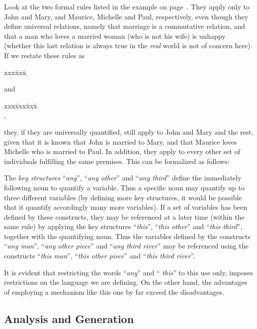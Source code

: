 Look at the two formal rules listed in the example on
page~\pageref{specrules}. They apply only to John and Mary, and
Maurice, Michelle and Paul, respectively, even though they define
universal relations, namely that marriage is a commutative relation,
and that a man who loves a married woman (who is not his wife) is
unhappy (whether this last relation is always true in the {\em real\/}
world is not of concern here). If we restate these rules as
\begin{tabbing}
  xxx\= xxx\= \kill
  \>
\end{tabbing}
and
\begin{tabbing}
  xxx\= xxx\= xxx\= \kill
  \>\\
  \>\>,
\end{tabbing}
they, if they are universally quantified, still apply to John and Mary
and the rest, given that it is known that John is married to Mary, and
that Maurice loves Michelle who is married to Paul. In addition, they
apply to every other set of individuals fulfilling the same premises.
This can be formalized as follows:

The {\em key structures\/} ``{\em any\/}'', ``{\em any other\/}'' and
``{\em any third\/}'' define the immediately following noun to
quantify a variable. Thus a specific noun may quantify up to three
different variables (by defining more key structures, it would be
possible that it quantify accordingly many more variables). If a set
of variables has been defined by these constructs, they may be
referenced at a later time (within the same rule) by applying the key
structures ``{\em this\/}'', ``{\em this other\/}'' and ``{\em this
third\/}'', together with the quantifying noun. Thus the variables
defined by the constructs ``{\em any man\/}'', ``{\em any other
piece\/}'' and ``{\em any third river\/}'' may be referenced using the
constructs ``{\em this man\/}'', ``{\em this other piece\/}'' and
``{\em this third river\/}''.

It is evident that restricting the words ``{\em any\/}'' and ``{\em
this\/}'' to this use only, imposes restrictions on the language we
are defining. On the other hand, the advantages of employing a
mechanism like this one by far exceed the disadvantages.

\subsection{Analysis and Generation}
\label{anagen}

